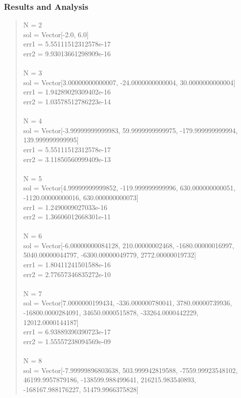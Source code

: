 \documentclass[letterpaper,12pt]{article}
\begin{document}
\subsubsection{Results and Analysis}

\begin{quote}
N = 2
\\sol = Vector[-2.0, 6.0]
\\err1 = 5.55111512312578e-17
\\err2 = 9.93013661298909e-16
\\
\\N = 3
\\sol = Vector[3.00000000000007, -24.0000000000004, 30.0000000000004]
\\err1 = 1.94289029309402e-16
\\err2 = 1.03578512786223e-14
\\
\\N = 4
\\sol = Vector[-3.99999999999983, 59.9999999999975, -179.999999999994, 139.999999999995]
\\err1 = 5.55111512312578e-17
\\err2 = 3.11850560999409e-13
\\
\\N = 5
\\sol = Vector[4.99999999999852, -119.999999999996, 630.000000000051, -1120.00000000016, 630.000000000073]
\\err1 = 1.2490009027033e-16
\\err2 = 1.36606012668301e-11
\\
\\N = 6
\\sol = Vector[-6.00000000084128, 210.00000002468, -1680.00000016997, 5040.00000044797, -6300.00000049779, 2772.00000019732]
\\err1 = 1.80411241501588e-16
\\err2 = 2.77657346835272e-10
\\
\\N = 7
\\sol = Vector[7.0000000199434, -336.000000780041, 3780.00000739936, -16800.0000284091, 34650.0000515878, -33264.0000442229, 12012.0000144187]
\\err1 = 6.93889390390723e-17
\\err2 = 1.55557238094569e-09
\\
\\N = 8
\\sol = Vector[-7.99999896803638, 503.999942819588, -7559.99923548102, 46199.9957879186, -138599.988499641, 216215.983540893, -168167.988176227, 51479.9966375828]

\end{quote}
\end{document}

